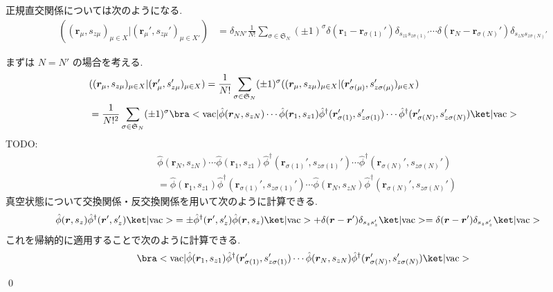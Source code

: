 \documentclass[uplatex,dvipdfmx,a4paper,11pt]{jlreq}
\makeatletter
\renewcommand{\SS}{\mathfrak{S}}
\newcommand{\rr}{\bm{r}}
\numberwithin{equation}{section}
\theoremstyle{definition}
\renewenvironment{proof}[1][\proofname]{\par
  \normalfont
  \topsep6\p@\@plus6\p@ \trivlist
  \item[\hskip\labelsep{\bfseries #1}\@addpunct{\bfseries}]\ignorespaces\quad\par
}{
  \qed\endtrivlist\@endpefalse
}
\renewcommand\proofname{証明}
\makeatother
\begin{document}
\begin{theorem}[Q21-86(ii)]
  正規直交関係については次のようになる.
  \begin{align}
    ((\rr_{\mu}, s_{z\mu})_{\mu\in X}|(\rr_{\mu}', s_{z\mu}')_{\mu\in X'}) & = \delta_{NN'}\frac{1}{N!}\sum_{\sigma\in\SS_N}(\pm 1)^\sigma\delta(\rr_1 - \rr_{\sigma(1)}')\delta_{s_{z1}s_{z\sigma(1)}'}\cdots\delta(\rr_N - \rr_{\sigma(N)}')\delta_{s_{zN}s_{z\sigma(N)}'}
  \end{align}
\end{theorem}
\begin{proof}
  まずは $N = N'$ の場合を考える.
  \begin{align}
     & ((\rr_{\mu}, s_{z\mu})_{\mu\in X}|(\rr_{\mu}', s_{z\mu}')_{\mu\in X}) = \frac{1}{N!}\sum_{\sigma\in\SS_N}(\pm 1)^\sigma((\rr_{\mu}, s_{z\mu})_{\mu\in X}|(\rr_{\sigma(\mu)}', s_{z\sigma(\mu)}')_{\mu\in X})                                                    \\
     & = \frac{1}{N!^2}\sum_{\sigma\in\SS_N}(\pm 1)^\sigma\bra<\mathrm{vac}|\hat{\phi}(\rr_N, s_{zN})\cdots\hat{\phi}(\rr_1, s_{z1})\hat{\phi}^\dagger(\rr_{\sigma(1)}', s_{z\sigma(1)}')\cdots\hat{\phi}^\dagger(\rr_{\sigma(N)}', s_{z\sigma(N)}')\ket|\mathrm{vac}>
  \end{align}
  TODO:
  \begin{align}
     & \hat{\phi}(\rr_N, s_{zN})\cdots\hat{\phi}(\rr_1, s_{z1})\hat{\phi}^\dagger(\rr_{\sigma(1)}', s_{z\sigma(1)}')\cdots\hat{\phi}^\dagger(\rr_{\sigma(N)}', s_{z\sigma(N)}') \\
     & = \hat{\phi}(\rr_1, s_{z1})\hat{\phi}^\dagger(\rr_{\sigma(1)}', s_{z\sigma(1)}')\cdots\hat{\phi}(\rr_N, s_{zN})\hat{\phi}^\dagger(\rr_{\sigma(N)}', s_{z\sigma(N)}')
  \end{align}
  真空状態について交換関係・反交換関係を用いて次のように計算できる.
  \begin{align}
    \hat{\phi}(\rr, s_z)\hat{\phi}^\dagger(\rr', s_z')\ket|\mathrm{vac}> & = \pm\hat{\phi}^\dagger(\rr', s_z')\hat{\phi}(\rr, s_z)\ket|\mathrm{vac}> + \delta(\rr - \rr')\delta_{s_zs_z'}\ket|\mathrm{vac}> = \delta(\rr - \rr')\delta_{s_zs_z'}\ket|\mathrm{vac}>
  \end{align}
  これを帰納的に適用することで次のように計算できる.
  \begin{align}
     & \bra<\mathrm{vac}|\hat{\phi}(\rr_1, s_{z1})\hat{\phi}^\dagger(\rr_{\sigma(1)}', s_{z\sigma(1)}')\cdots\hat{\phi}(\rr_N, s_{zN})\hat{\phi}^\dagger(\rr_{\sigma(N)}', s_{z\sigma(N)}')\ket|\mathrm{vac}> \\

\end{align}
\end{proof}
\end{document}
